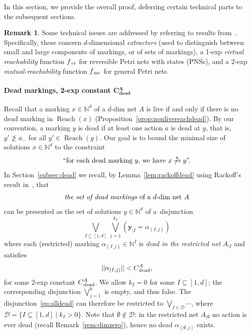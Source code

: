 \documentclass[11pt,a4paper]{amsart}
\DeclareMathOperator{\Reach}{Reach}
\newcommand{\step}[1]{\mathrel{\xrightarrow{#1}}}
\newcommand{\reach}{\step{*}}
\newcommand{\bvar}[1]{\mathbf{#1}}
\newcommand{\nnorm}[1]{||#1||}
\newcommand{\vr}{{}_\textnormal{vr}}
\newcommand{\mr}{{}_\textnormal{mr}}
\newcommand{\dead}{{}_\textnormal{dead}}
\newcommand{\bdead}{{}_\textbf{dead}}
\newcommand{\Nat}{\mathbb{N}}
\newcommand{\restr}[1]{_{|{#1}}}
\newcommand{\setN}{\Nat}
\theoremstyle{plain}
\theoremstyle{definition}
\newtheorem{rem}[thm]{Remark}
\theoremstyle{defC}
\theoremstyle{thmC}
\begin{document}
In this section, we provide the overall proof, deferring certain
technical parts 
to the subsequent sections.

\begin{rem}\label{rem:Lerresults}
Some technical issues are addressed by referring to results from~\cite{DBLP:conf/fsttcs/Leroux19}. Specifically, these concern
$d$-dimensional \emph{extractors} (used to distinguish between small
	and large components of markings, or of sets of markings),
a 1-exp \emph{virtual reachability} function $f\vr$ for reversible
	Petri nets with states (PNSs), and 
	a 2-exp \emph{mutual-reachability} function $f\mr$ for general
	Petri nets.
\end{rem}

\paragraph{Dead markings, 2-exp constant $\bm{C\bdead^A}$}
Recall that a marking $x\in\setN^d$ of a $d$-dim net $A$ is live if and only if there is no
dead marking in $\Reach(x)$
(Proposition~\ref{prop:nonlivereachdead}). By our convention, a
marking $y$ is dead if at least one action $a$ is dead at $y$, that
is, $y'\not\geq a_-$ for all $y'\in\Reach(y)$.
Our goal is to bound the minimal size of solutions $x\in\setN^d$ to the constraint
\begin{equation}\label{eq:firstconstr}
	\textnormal{``for each dead marking $y$, we have  $x\not\reach
	y$''.}
\end{equation}
In Section~\ref{subsec:dead} we recall, by
Lemma~\ref{lem:rackoffdead} using  Rackoff's
result in~\cite{DBLP:journals/tcs/Rackoff78}, that 
\begin{equation*}
	\textnormal{\emph{the set of dead markings} of a $d$-dim net
	$A$} 
\end{equation*}
	can be presented
as the set of solutions $y\in\setN^d$ 
of a~disjunction
\begin{equation}\label{eq:alldead}
	\bigvee_{I\subseteq [1,d]} \,\bigvee_{j=1}^{k_I}
	\left(\bvar{y}\restr{I}=\alpha_{(I,j)}\right)
\end{equation}
where 
each (restricted) marking $\alpha_{(I,j)}\in\setN^{I}$ is \emph{dead in the 
restricted net} $A\restr{I}$ and satisfies 
\[\nnorm{\alpha_{(I,j)}}< C\dead^A,\] for some 2-exp
constant $C\dead^A$.
We allow $k_I=0$ for some $I\subseteq [1,d]$; the corresponding
disjunction $\bigvee_{j=1}^{0}$ is empty, and thus false.  The
disjunction~\eqref{eq:alldead} can therefore be restricted to
$\bigvee_{I\in\mathcal{D}}\cdots$, where
$\mathcal{D}=\{I\subseteq[1,d] \mid k_I>0\}$.  
Note that $\emptyset\notin\mathcal{D}$: in the restricted net
$A\restr{\emptyset}$ no action is ever dead (recall
Remark~\ref{rem:dimzero}), hence no dead $\alpha_{(\emptyset,j)}$
exists.
\end{document}
